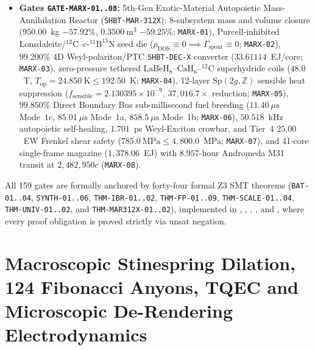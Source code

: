 \documentclass[11pt,onecolumn]{article}
\begin{document}
\begin{itemize}
    \item \textbf{Gates \texttt{GATE-}\allowbreak\texttt{MARX-01..08}:} 5th-Gen Exotic-Material Autopoietic Mass-Annihilation Reactor (\texttt{SHBT-MAR-312X}): 8-subsystem mass and volume closure ($950.00$~kg $-57.92\%$, $0.3500~\mathrm{m}^3$ $-59.25\%$; \texttt{MARX-01}), Purcell-inhibited Lonsdaleite/$^{12}\text{C}$--$\text{c-}^{11}\text{B}^{15}\text{N}$ seed die ($\rho_{\text{DOS}} \equiv 0 \implies \Gamma_{\text{spont}} \equiv 0$; \texttt{MARX-02}), $99.200\%$ 4D Weyl-polariton/PTC \texttt{SHBT-DEC-X} converter ($33.61114$~EJ/core; \texttt{MARX-03}), zero-pressure tethered $\text{LaBeH}_8\text{--}\text{CaH}_6\text{--}^{12}\text{C}$ superhydride coils ($48.0$~T, $T_{\text{op}} = 24.850~\text{K} \le 192.50$~K; \texttt{MARX-04}), 12-layer $\mathrm{Sp}(2g, \mathbb{Z})$ sensible heat suppression ($f_{\text{sensible}} = 2.130395\times 10^{-9}$, $37{,}016.7\times$ reduction; \texttt{MARX-05}), $99.850\%$ Direct Boundary Bus sub-millisecond fuel breeding ($11.40~\mu\text{s}$ Mode~1c, $85.01~\mu\text{s}$ Mode~1a, $858.5~\mu\text{s}$ Mode~1b; \texttt{MARX-06}), $50.518$~kHz autopoietic self-healing, $1.701$~ps Weyl-Exciton crowbar, and Tier~4 $25.00$~EW Frenkel shear safety ($785.0~\text{MPa} \le 4{,}800.0$~MPa; \texttt{MARX-07}), and 41-core single-frame magazine ($1{,}378.06$~EJ) with $8.957$-hour Andromeda M31 transit at $2{,}482{,}950c$ (\texttt{MARX-08}).
\end{itemize}
All 159 gates are formally anchored by forty-four formal Z3 SMT theorems (\texttt{BAT-01..04}, \texttt{SYNTH-01..06}, \texttt{THM-IBR-01..02}, \texttt{THM-FP-01..09}, \texttt{THM-SCALE-01..04}, \texttt{THM-UNIV-01..02}, and \texttt{THM-MAR312X-01..02}), implemented in , , , , and , where every proof obligation is proved strictly via unsat negation.

\FloatBarrier
\section[Stinespring Dilation, Fibonacci Anyons, TQEC and Microscopic De-Rendering Electrodynamics]{Macroscopic Stinespring Dilation, 124 Fibonacci Anyons, TQEC and Microscopic De-Rendering Electrodynamics}
\label{sec:dilation}

\FloatBarrier
\end{document}
